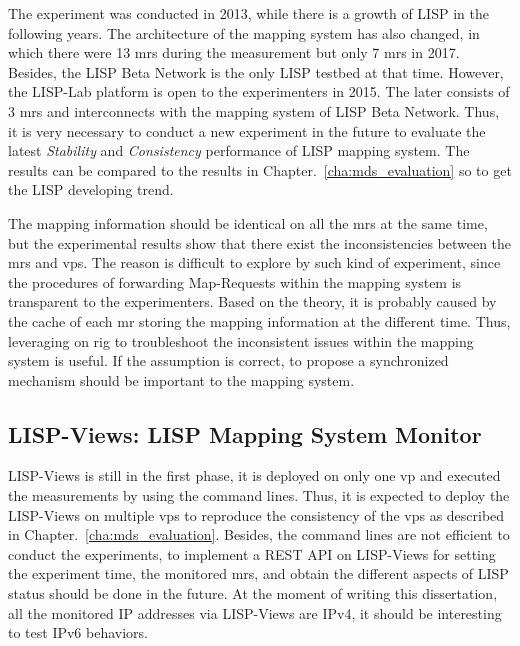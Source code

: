 The experiment was conducted in 2013, while there is a growth of LISP in the following years. The architecture of the mapping system has also changed, in which there were 13 \acrshort{mr}s during the measurement but only 7 \acrshort{mr}s in 2017. Besides, the LISP Beta Network is the only LISP testbed at that time. However, the LISP-Lab platform is open to the experimenters in 2015. The later consists of 3 \acrshort{mr}s and interconnects with the mapping system of LISP Beta Network. Thus, it is very necessary to conduct a new experiment in the future to evaluate the latest \emph{Stability} and \emph{Consistency} performance of LISP mapping system. The results can be compared to the results in Chapter.~\ref{cha:mds_evaluation} so to get the LISP developing trend. 

The mapping information should be identical on all the \acrshort{mr}s at the same time, but the experimental results show that there exist the inconsistencies between the \acrshort{mr}s and \acrshort{vp}s. The reason is difficult to explore by such kind of experiment, since the procedures of forwarding Map-Requests within the mapping system is transparent to the experimenters. Based on the theory, it is probably caused by the cache of each \acrshort{mr} storing the mapping information at the different time. Thus, leveraging on \acrshort{rig} to troubleshoot the inconsistent issues within the mapping system is useful. If the assumption is correct, to propose a synchronized mechanism should be important to the mapping system.

\subsection{LISP-Views: LISP Mapping System Monitor}    
LISP-Views is still in the first phase, it is deployed on only one \acrshort{vp} and executed the measurements by using the command lines. Thus, it is expected to deploy the LISP-Views on multiple \acrshort{vp}s to reproduce the consistency of the \acrshort{vp}s as described in Chapter.~\ref{cha:mds_evaluation}. Besides, the command lines are not efficient to conduct the experiments, to implement a REST API on LISP-Views for setting the experiment time, the monitored \acrshort{mr}s, and obtain the different aspects of LISP status should be done in the future. At the moment of writing this dissertation, all the monitored IP addresses via LISP-Views are IPv4, it should be interesting to test IPv6 behaviors. 

